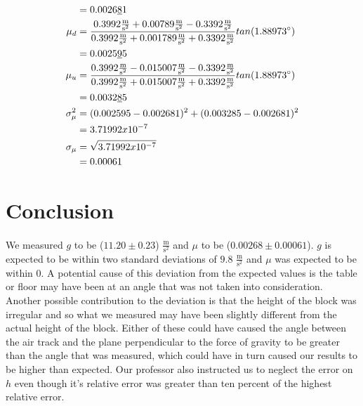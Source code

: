 \documentclass[12pt]{article}
\begin{document}
\begin{align}
            &= 0.0026\underline{8}1 \nonumber\\
            \mu_d &= \frac{0.3992\frac{\text{m}}{\text{s}^2 } + 0.00789\frac{\text{m}}{\text{s}^2 } - 0.3392\frac{\text{m}}{\text{s}^2 }}{0.3992\frac{\text{m}}{\text{s}^2 } + 0.001789\frac{\text{m}}{\text{s}^2 } +0.3392\frac{\text{m}}{\text{s}^2 }}tan(1.88973\degree)\\
            &= 0.0025\underline{9}5\nonumber\\
            \mu_u &= \frac{0.3992\frac{\text{m}}{\text{s}^2 } - 0.015007\frac{\text{m}}{\text{s}^2 } - 0.3392\frac{\text{m}}{\text{s}^2 }}{0.3992\frac{\text{m}}{\text{s}^2 } + 0.015007\frac{\text{m}}{\text{s}^2 } +0.3392\frac{\text{m}}{\text{s}^2 }}tan(1.88973\degree)\nonumber\\
            &= 0.0032\underline{8}5\nonumber\\
            \sigma^2_{\mu} &= (0.002595-0.002681)^2+(0.003285-0.002681)^2\nonumber\\
            &= 3.71992x10^{-7}\nonumber\\
            \sigma_{\mu} &= \sqrt{3.71992x10^{-7}}\nonumber\\
            &= 0.00061\nonumber
        \end{align}
    \section{Conclusion}
    \paragraph{}We measured $g$ to be (\(11.20 \pm 0.23\)) \(\frac{\text{m}}{\text{s}^2}\) and $\mu$ to be 
        (\(0.00268 \pm 0.00061\)). $g$ is expected to be within two standard deviations of $9.8$ \(\frac{\text{m}}{\text{s}^2}\)
        and $\mu$ was expected to be within 0. A potential cause of this deviation from the expected values is the table or 
        floor may have been at an angle that was not taken into consideration. Another possible contribution to the deviation
         is that the height of the block was irregular and so what we measured may have been slightly different from the 
        actual height of the block. Either of these could have caused the angle between the air track and the plane perpendicular to 
        the force of gravity to be greater than the angle that was measured, which could have in turn caused our results to be higher 
        than expected. Our professor also instructed us to neglect the error on $h$ even though it's  relative error was greater than 
        ten percent of the highest relative error. 
\end{document}
